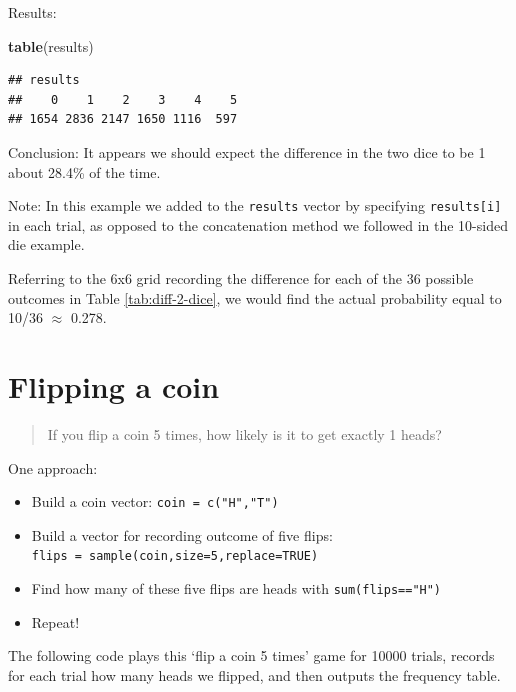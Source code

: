 \documentclass[
]{book}
\newenvironment{Shaded}{\begin{snugshade}}{\end{snugshade}}
\newcommand{\FunctionTok}[1]{\textcolor[rgb]{0.13,0.29,0.53}{\textbf{#1}}}
\newcommand{\NormalTok}[1]{#1}
\providecommand{\tightlist}{%
  \setlength{\itemsep}{0pt}\setlength{\parskip}{0pt}}
\theoremstyle{definition}
\theoremstyle{definition}
\theoremstyle{definition}
\theoremstyle{definition}
\theoremstyle{remark}
\begin{document}
Results:

\begin{Shaded}
\begin{Highlighting}[]
\FunctionTok{table}\NormalTok{(results)}
\end{Highlighting}
\end{Shaded}

\begin{verbatim}
## results
##    0    1    2    3    4    5 
## 1654 2836 2147 1650 1116  597
\end{verbatim}

Conclusion: It appears we should expect the difference in the two dice to be 1 about 28.4\% of the time.

Note: In this example we added to the \texttt{results} vector by specifying \texttt{results{[}i{]}} in each trial, as opposed to the concatenation method we followed in the 10-sided die example.

Referring to the 6x6 grid recording the difference for each of the 36 possible outcomes in Table \ref{tab:diff-2-dice}, we would find the actual probability equal to 10/36 \(\approx\) 0.278.

\section{Flipping a coin}\label{flip-coin-R}

\begin{quote}
If you flip a coin 5 times, how likely is it to get exactly 1 heads?
\end{quote}

One approach:

\begin{itemize}
\tightlist
\item
  Build a coin vector: \texttt{coin\ =\ c("H","T")}
\item
  Build a vector for recording outcome of five flips: \texttt{flips\ =\ sample(coin,size=5,replace=TRUE)}
\item
  Find how many of these five flips are heads with \texttt{sum(flips=="H")}
\item
  Repeat!
\end{itemize}

The following code plays this `flip a coin 5 times' game for 10000 trials, records for each trial how many heads we flipped, and then outputs the frequency table.
\end{document}
